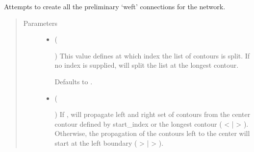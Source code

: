 \documentclass[letterpaper,10pt,english]{sphinxmanual}
\begin{document}
\begin{fulllineitems}
\begin{fulllineitems}
\label{\detokenize{cockatoo:cockatoo.KnitNetwork.initialize_weft_edges}}
Attempts to create all the preliminary ‘weft’ connections for the
network.
\begin{quote}\begin{description}
\item[{Parameters}] \leavevmode\begin{itemize}
\item {} 
 (%
\begin{footnote}[131]\sphinxAtStartFootnote
{}
%
\end{footnote}\sphinxstyleliteralemphasis{\sphinxupquote{, }}) \textendash{} 
This value defines at which index the list of contours is split.
If no index is supplied, will split the list at the longest
contour.

Defaults to .


\item {} 
 (%
\begin{footnote}[132]\sphinxAtStartFootnote
{}
%
\end{footnote}\sphinxstyleliteralemphasis{\sphinxupquote{, }}) \textendash{} 
If , will propagate left and right set of contours from
the center contour defined by start\_index or the longest contour
( \textless{} | \textgreater{} ). Otherwise, the propagation of the contours left to the
center will start at the left boundary ( \textgreater{} | \textgreater{} ).


\end{itemize}
\end{description}
\end{quote}
\end{fulllineitems}
\end{fulllineitems}
\end{document}
